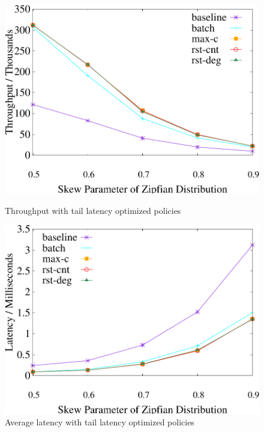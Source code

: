 \begin{figure}[t]
    \centering
	\begin{minipage}[b]{0.31\linewidth}
	\centering
	\includegraphics[width=\textwidth]{./exp_fig/restart/tps}
	\vspace{-2em}
	\caption{Throughput with tail latency optimized policies}
	\label{fig:restart:tps}
	\end{minipage}
\quad
    \begin{minipage}[b]{0.31\linewidth}
	\centering
	\includegraphics[width=\textwidth]{./exp_fig/restart/latency}
	\vspace{-2em}
	\caption{Average latency with tail latency optimized policies}
	\label{fig:restart:latency}
	\end{minipage}

\end{figure}
